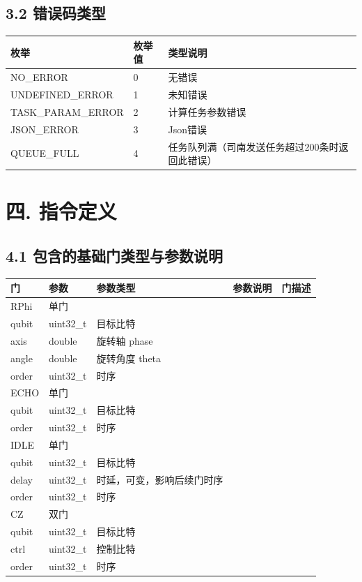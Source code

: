 \documentclass{ctexart}
\begin{document}
\subsection{3.2 错误码类型}

\begin{longtable}{|l|l|l|}
\hline
\textbf{\textbf{枚举}} & \textbf{\textbf{枚举值}} & \textbf{\textbf{类型说明}} \\
\hline
NO_ERROR & 0 & 无错误 \\
UNDEFINED_ERROR & 1 & 未知错误 \\
TASK_PARAM_ERROR & 2 & 计算任务参数错误 \\
JSON_ERROR & 3 & Json错误 \\
QUEUE_FULL & 4 & 任务队列满（司南发送任务超过200条时返回此错误） \\
\hline
\end{longtable}

\section{四. 指令定义}

\subsection{4.1 包含的基础门类型与参数说明}

\begin{longtable}{|l|l|l|l|l|}
\hline
\textbf{门} & \textbf{参数} & \textbf{参数类型} & \textbf{参数说明} & \textbf{门描述} \\
\hline
RPhi & 单门 \\
qubit & uint32_t & 目标比特 \\
axis & double & 旋转轴 phase \\
angle & double & 旋转角度 theta \\
order & uint32_t & 时序 \\
ECHO & 单门 \\
qubit & uint32_t & 目标比特 \\
order & uint32_t & 时序 \\
IDLE & 单门 \\
qubit & uint32_t & 目标比特 \\
delay & uint32_t & 时延，可变，影响后续门时序 \\
order & uint32_t & 时序 \\
CZ & 双门 \\
qubit & uint32_t & 目标比特 \\
ctrl & uint32_t & 控制比特 \\
order & uint32_t & 时序 \\
\hline
\end{longtable}
\end{document}
